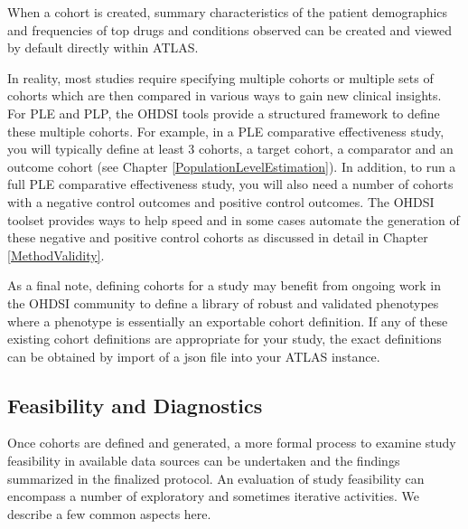 \documentclass[11pt]{book}
\theoremstyle{definition}
\theoremstyle{definition}
\theoremstyle{definition}
\theoremstyle{remark}
\begin{document}
When a cohort is created, summary characteristics of the patient demographics and frequencies of top drugs and conditions observed can be created and viewed by default directly within ATLAS.

In reality, most studies require specifying multiple cohorts or multiple sets of cohorts which are then compared in various ways to gain new clinical insights.
For PLE and PLP, the OHDSI tools provide a structured framework to define these multiple cohorts. For example, in a PLE comparative effectiveness study, you will typically define at least 3 cohorts, a target cohort, a comparator and an outcome cohort (see Chapter \ref{PopulationLevelEstimation}). In addition, to run a full PLE comparative effectiveness study, you will also need a number of cohorts with a negative control outcomes and positive control outcomes. The OHDSI toolset provides ways to help speed and in some cases automate the generation of these negative and positive control cohorts as discussed in detail in Chapter \ref{MethodValidity}.

As a final note, defining cohorts for a study may benefit from ongoing work in the OHDSI community to define a library of robust and validated phenotypes where a phenotype is essentially an exportable cohort definition. If any of these existing cohort definitions are appropriate for your study, the exact definitions can be obtained by import of a json file into your ATLAS instance.

\hypertarget{Feasibility}{%
\subsection{Feasibility and Diagnostics}\label{Feasibility}}

Once cohorts are defined and generated, a more formal process to examine study feasibility in available data sources can be undertaken and the findings summarized in the finalized protocol. An evaluation of study feasibility can encompass a number of exploratory and sometimes iterative activities. We describe a few common aspects here.
\end{document}
